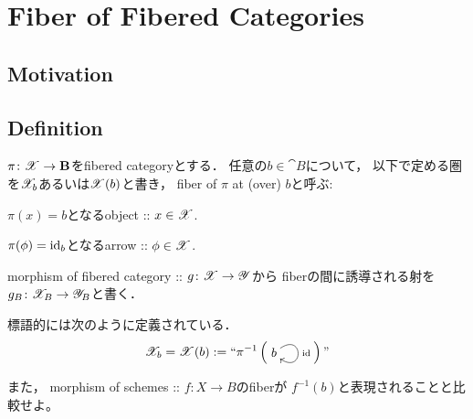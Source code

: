 \documentclass[a4paper, dvipdfmx]{jsarticle}
\begin{document}
\section{Fiber of Fibered Categories}
\subsection{Motivation}

\subsection{Definition}
\begin{Def}[Fiber]
    $\pi \colon \fibX \to \cat{B}$をfibered categoryとする．
    任意の$b \in \cat{B}$について，
    以下で定める圏を$\fibX_b$あるいは$\fibX(b)$と書き，
    fiber of $\pi$ at (over) $b$と呼ぶ:
    \begin{description}[labelindent=1cm]
        \item[Object.] $\pi(x)=b$となるobject :: $x \in \fibX$.
        \item[Arrow.] $\pi(\phi)=\id[b]$となるarrow :: $\phi \in \fibX$.
    \end{description}

    morphism of fibered category :: $g \colon \fibX \to \fibY$から
    fiberの間に誘導される射を$g_B \colon \fibX_B \to \fibY_B$と書く．
\end{Def}
\begin{Remark}
    標語的には次のように定義されている．
    \[
        \fibX_b=\fibX(b):=``
        \pi^{-1} \left(
        \vcenter{\xymatrix{
            b \ar@(ur,dr)^-{\id}
        }}
        \right)"
    \]
    
    また，
    morphism of schemes :: $f \colon X \to B$のfiberが
    $f^{-1}(b)$と表現されることと比較せよ。
\end{Remark}
\end{document}
